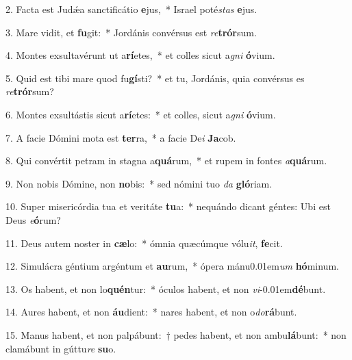\item 2. Facta est Judǽa sanctificátio \textbf{e}jus,~* Israel poté\hspace{0.03em}\textit{stas} \textbf{e}jus.

\item 3. Mare vidit, et \textbf{fu}git:~* Jordánis convérsus est \textit{re}\textbf{trór}sum.

\item 4. Montes exsultavérunt ut a\textbf{rí}etes,~* et colles sicut a\textit{gni} \textbf{ó}vium.

\item 5. Quid est tibi mare quod fu\textbf{gí}sti?~* et tu, Jordánis, quia convérsus es \textit{re}\textbf{trór}sum?

\item 6. Montes exsultástis sicut a\textbf{rí}etes:~* et colles, sicut a\textit{gni} \textbf{ó}vium.

\item 7. A facie Dómini mota est \textbf{ter}ra,~* a facie De\hspace{0.03em}\textit{i} \textbf{Ja}cob.

\item 8. Qui convértit petram in stagna a\textbf{quá}rum,~* et rupem in fontes \textit{a}\textbf{quá}rum.

\item 9. Non nobis Dómine, non \textbf{no}bis:~* sed nómini tuo \textit{da} \textbf{gló}riam.

\item 10. Super misericórdia tua et veritáte \textbf{tu}a:~* nequándo dicant géntes: Ubi est Deus \textit{e}\textbf{ó}rum?

\item 11. Deus autem noster in \textbf{cæ}lo:~* ómnia quæcúmque vólu\textit{it}, \textbf{fe}cit.

\item 12. Simulácra géntium argéntum et \textbf{au}rum,~* ópera mánu\kern 0.01em\textit{um} \textbf{hó}minum.

\item 13. Os habent, et non lo\textbf{quén}tur:~* óculos habent, et non \textit{vi}\kern -0.01em\textbf{dé}bunt.

\item 14. Aures habent, et non \textbf{áu}dient:~* nares habent, et non o\textit{do}\textbf{rá}bunt.

\item 15. Manus habent, et non palpábunt:~† pedes habent, et non ambu\textbf{lá}bunt:~* non clamábunt in gúttu\textit{re} \textbf{su}o.

